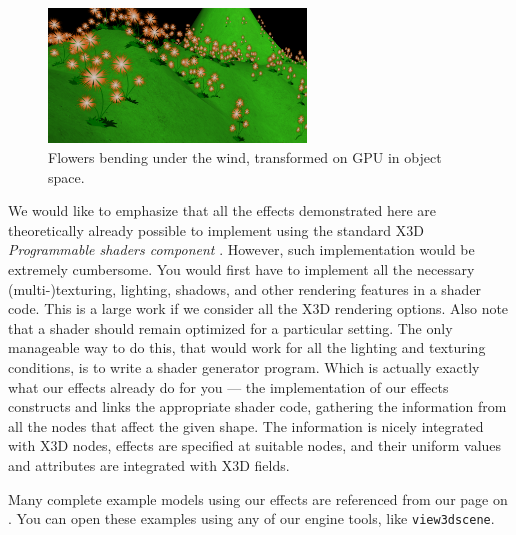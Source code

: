 \documentclass{egpubl}
\begin{document}
\setcounter{figure}{8}
\begin{figure}[H]
  \centering
  \includegraphics[width=2.7in]{flowers-cropped}
  \caption{Flowers bending under the wind, transformed on GPU in object space.}
  \label{fig_flowers}
\end{figure}

We would like to emphasize that all the effects demonstrated here
are theoretically already possible to implement using the standard
X3D \textit{Programmable shaders component} \cite{x3d:shaders}. However, such implementation
would be extremely cumbersome.
You would first have to implement all the necessary (multi-)texturing, lighting,
shadows, and other rendering features in a shader code.
This is a large work if we consider all the X3D rendering options.
Also note that a shader should remain optimized for a particular setting.
The only manageable way to do this, that would work for all the lighting
and texturing conditions, is to write a shader generator program.
Which is actually exactly what our effects already do for you ---
the implementation of our effects constructs and links
the appropriate shader code, gathering the information from all the nodes
that affect the given shape. The information is nicely integrated
with X3D nodes, effects are specified at suitable nodes, and their
uniform values and attributes are integrated with X3D fields.

Many complete example models using our effects
are referenced from our page on
.
You can open these examples using any of our engine tools,
like \texttt{view3dscene}.

\end{document}
